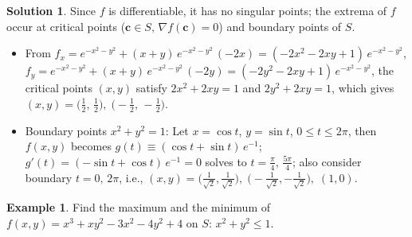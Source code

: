 \documentclass[10pt]{extarticle}
\newcommand{\ds}{\displaystyle}
\theoremstyle{definition}
\newtheorem*{ex}{Example}
\newtheorem*{sol}{Solution}
\newcommand{\vc}{\mathbf{c}}
\begin{document}
\begin{sol}
  Since $f$ is differentiable, it has no singular points; the extrema of $f$ occur at critical points ($\vc\in S,\,\nabla f(\vc) = 0$) and boundary points of $S$. \vspace{-1mm} %
  \begin{itemize}\setlength\itemsep{0em}
    \item From $\ds f_x = e^{-x^2 - y^2} + (x + y)\,e^{-x^2 - y^2}\,(-2x) = (-2 x^2 - 2xy + 1)\,e^{-x^2 - y^2}$, \\$\ds f_y = e^{-x^2 - y^2} + (x + y)\,e^{-x^2 - y^2}\,(-2y) = (-2 y^2 - 2xy + 1)\,e^{-x^2 - y^2}$, the critical points $(x, y)$ satisfy $\ds 2x^2 + 2xy = 1$ and $2y^2 + 2xy = 1$, which gives $(x, y) = \big(\frac{1}{2},\,\frac{1}{2}\big),\;\big(-\frac{1}{2},\,-\frac{1}{2}\big)$. 
    \item Boundary points $x^2 + y^2 = 1$: Let $x = \cos t$, $y = \sin t$, $0\leqslant t\leqslant 2\pi$, then $f(x, y)$ becomes $\ds g(t)\equiv(\cos t + \sin t)\,e^{-1}$; $g'(t) = (-\sin t + \cos t)\,e^{-1} = 0$ solves to $t = \frac{\pi}{4},\,\frac{5\pi}{4}$; also consider boundary $t = 0,\,2\pi$, i.e., $(x, y) = \big(\frac{1}{\sqrt{2}}, \frac{1}{\sqrt{2}}\big),\;\big(-\frac{1}{\sqrt{2}}, -\frac{1}{\sqrt{2}}\big),\;(1, 0)$.  
  \end{itemize}
  \begin{center}
  \end{center}
\end{sol}

\newpage

\begin{ex}
  Find the maximum and the minimum of $\ds f(x, y) = x^3 + xy^2 - 3x^2 - 4y^2 + 4$ on $S:\,x^2 + y^2 \leqslant 1$. 
\end{ex}
\end{document}
